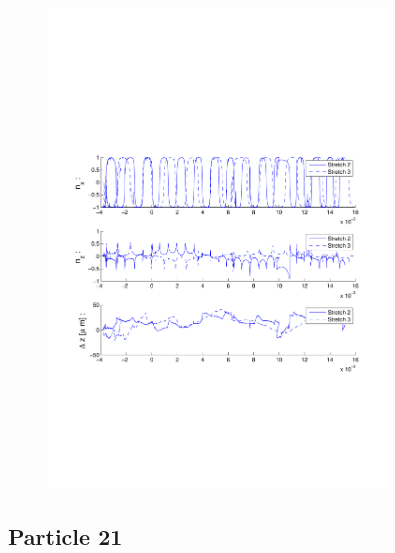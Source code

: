 \begin{figure}[H]

\centering

\includegraphics[width=0.8\textwidth]{Images/Particle 17/Stretch2.pdf}

\end{figure}

\subsection{Particle 21}

